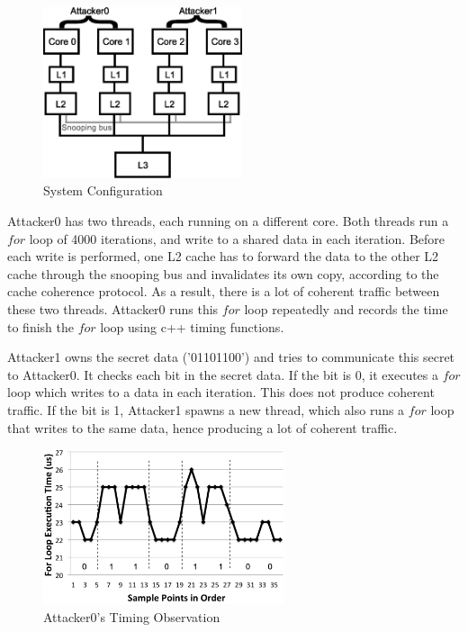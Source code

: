 \begin{figure}
    \begin{center}
        \includegraphics[width=2.3in]{figs/coherent_system.eps}
        \caption{System Configuration}
        \label{fig:coherent_system}
    \end{center}
\end{figure}

Attacker0 has two threads, each running on a different core. Both threads run a $for$ loop of 4000 iterations, and
write to a shared data in each iteration. Before each write is performed, one L2 cache has to forward the data
to the other L2 cache through the snooping bus and invalidates its own copy, according to the cache coherence protocol. 
As a result, there is a lot of coherent traffic between these two threads. Attacker0 runs this $for$ loop repeatedly and
records the time to finish the $for$ loop using c++ timing functions.

Attacker1 owns the secret data ('01101100') and tries to communicate this secret to Attacker0. It checks each bit
in the secret data. If the bit is 0, it executes a $for$ loop which writes to a data in each iteration. This does not produce 
coherent traffic. If the bit is 1, Attacker1 spawns a new thread, which also runs a $for$ loop that writes to the same data, hence producing a lot of coherent traffic. 

\begin{figure}
    \begin{center}
        \includegraphics[width=2.79in]{figs/coherence_interference.eps}
        \caption{Attacker0's Timing Observation}
        \label{fig:coherence_interference}
    \end{center}
\end{figure}

